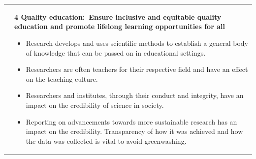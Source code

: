 \documentclass[../SustainableHEP.tex]{subfiles}
\begin{document}
\begin{longtable*}{l l}
\parbox[t]{\SDGleft\textwidth}{} & \parbox[t]{\SDGright\textwidth}{\textbf{4 Quality education:\ Ensure inclusive and equitable quality education and promote lifelong learning opportunities for all}
\begin{itemize}[leftmargin=20pt]
\item Research develops and uses scientific methods to establish a general body of knowledge that can be passed on in educational settings.
\item Researchers are often teachers for their respective field and have an effect on the teaching culture.
\item Researchers and institutes, through their conduct and integrity, have an impact on the credibility of science in society.
\item Reporting on advancements towards more sustainable research has an impact on the credibility. Transparency of how it was achieved and how the data was collected is vital to avoid greenwashing.
\end{itemize}}\\


\end{longtable*}
\end{document}
